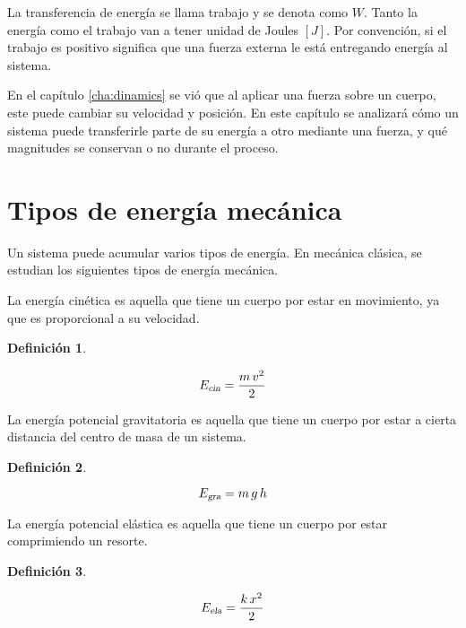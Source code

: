 \documentclass[a5paper,12pt,twoside]{book}
\newtheorem{defn}{{Definición}}[chapter]
\begin{document}
La transferencia de energía se llama trabajo y se denota como $W$.
Tanto la energía como el trabajo van a tener unidad de Joules $[J]$.
Por convención, si el trabajo es positivo significa que una fuerza externa le está entregando energía al sistema.

En el capítulo \ref{cha:dinamics} se vió que al aplicar una fuerza sobre un cuerpo, este puede cambiar su velocidad y posición.
En este capítulo se analizará cómo un sistema puede transferirle parte de su energía a otro mediante una fuerza, y qué magnitudes se conservan o no durante el proceso.


\section{Tipos de energía mecánica}

Un sistema puede acumular varios tipos de energía.
En mecánica clásica, se estudian los siguientes tipos de energía mecánica.

La energía cinética es aquella que tiene un cuerpo por estar en movimiento, ya que es proporcional a su velocidad.

\begin{mdframed}[style=MyFrame1]
    \begin{defn}
    \end{defn}
    \begin{equation*}
        {{E}_\textsl{{cin}}} = \frac{m \, v^2}{2}
    \end{equation*}
\end{mdframed}

La energía potencial gravitatoria es aquella que tiene un cuerpo por estar a cierta distancia del centro de masa de un sistema.

\begin{mdframed}[style=MyFrame1]
    \begin{defn}
    \end{defn}
    \begin{equation*}
        {{E}_\textsl{{gra}}} = m \, g \, h
    \end{equation*}
\end{mdframed}

La energía potencial elástica es aquella que tiene un cuerpo por estar comprimiendo un resorte.

\begin{mdframed}[style=MyFrame1]
    \begin{defn}
    \end{defn}
    \begin{equation*}
        {{E}_\textsl{{ela}}} = \frac{k \, x^2}{2}
    \end{equation*}
\end{mdframed}
\end{document}
